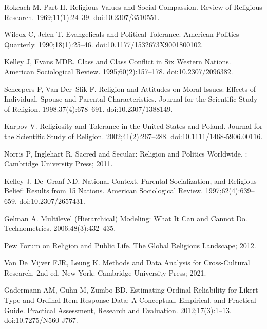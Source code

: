 \documentclass[10pt,letterpaper]{article}
\begin{document}
\begin{thebibliography}{10}
Rokeach M.
\newblock Part {{II}}. {{Religious Values}} and {{Social Compassion}}.
\newblock Review of Religious Research. 1969;11(1):24--39.
\newblock doi:{10.2307/3510551}.

Wilcox C, Jelen T.
\newblock Evangelicals and {{Political Tolerance}}.
\newblock American Politics Quarterly. 1990;18(1):25--46.
\newblock doi:{10.1177/1532673X9001800102}.

Kelley J, Evans MDR.
\newblock Class and {{Class Conflict}} in {{Six Western Nations}}.
\newblock American Sociological Review. 1995;60(2):157--178.
\newblock doi:{10.2307/2096382}.

Scheepers P, Van Der~Slik F.
\newblock Religion and {{Attitudes}} on {{Moral Issues}}: {{Effects}} of
  {{Individual}}, {{Spouse}} and {{Parental Characteristics}}.
\newblock Journal for the Scientific Study of Religion. 1998;37(4):678--691.
\newblock doi:{10.2307/1388149}.

Karpov V.
\newblock Religiosity and {{Tolerance}} in the {{United States}} and
  {{Poland}}.
\newblock Journal for the Scientific Study of Religion. 2002;41(2):267--288.
\newblock doi:{10.1111/1468-5906.00116}.

Norris P, Inglehart R.
\newblock Sacred and {{Secular}}: {{Religion}} and {{Politics Worldwide}}.
: {Cambridge University Press}; 2011.

Kelley J, De~Graaf ND.
\newblock National {{Context}}, {{Parental Socialization}}, and {{Religious
  Belief}}: {{Results}} from 15 {{Nations}}.
\newblock American Sociological Review. 1997;62(4):639--659.
\newblock doi:{10.2307/2657431}.

Gelman A.
\newblock Multilevel ({{Hierarchical}}) {{Modeling}}: {{What It Can}} and
  {{Cannot Do}}.
\newblock Technometrics. 2006;48(3):432--435.

{Pew Forum on Religion and Public Life}. The {{Global Religious Landscape}};
  2012.

Van De~Vijver FJR, Leung K.
\newblock Methods and {{Data Analysis}} for {{Cross}}-{{Cultural Research}}.
\newblock 2nd ed. {New York}: {Cambridge University Press}; 2021.

Gadermann AM, Guhn M, Zumbo BD.
\newblock Estimating Ordinal Reliability for {{Likert}}-Type and Ordinal Item
  Response Data: {{A}} Conceptual, Empirical, and Practical Guide.
\newblock Practical Assessment, Research and Evaluation. 2012;17(3):1--13.
\newblock doi:{10.7275/N560-J767}.


\end{thebibliography}
\end{document}
